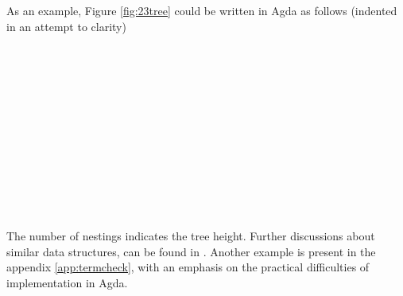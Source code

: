 \documentclass[12pt,twoside,notitlepage]{report}
\begin{document}
\begin{code}
\\
\>  \AgdaSymbol{(} \AgdaSymbol{:} \AgdaSymbol{)} \AgdaSymbol{:}  \<%
\\
\>[0]\<[2]%
\>[2] \AgdaSymbol{:}    \<%
\\
\>[0]\<[2]%
\>[2] \AgdaSymbol{:}  \AgdaSymbol{(} \AgdaSymbol{)}   \<%
\\
\end{code}

As an example, Figure \ref{fig:23tree} could be written in Agda as follows (indented in an attempt to clarity)

\begin{code}
\\
\> \AgdaSymbol{:}  \<%
\\
\> \AgdaSymbol{=} \AgdaSymbol{(}\AgdaSymbol{(}\AgdaSymbol{(}\<%
\\
\>[2]\<[14]%
\>[14]\AgdaSymbol{(}\<%
\\
\>[14]\<[18]%
\>[18]\AgdaSymbol{(}\<%
\\
\>[18]\<[20]%
\>[20]\AgdaSymbol{(}   \AgdaSymbol{)}\<%
\\
\>[18]\<[20]%
\>[20]\AgdaSymbol{(}  \AgdaSymbol{)}\<%
\\
\>[18]\<[20]%
\>[20]\AgdaSymbol{(}  \AgdaSymbol{))}\<%
\\
\>[0]\<[18]%
\>[18]\AgdaSymbol{(}\<%
\\
\>[18]\<[20]%
\>[20]\AgdaSymbol{(}   \AgdaSymbol{)}\<%
\\
\>[18]\<[20]%
\>[20]\AgdaSymbol{(}  \AgdaSymbol{))))))}\<%
\\
\end{code}
The number of  nestings indicates the tree height. 
Further discussions about similar data structures, can be found in \cite{nestedhinze}. Another example is present in the appendix \ref{app:termcheck}, with an emphasis on the practical difficulties of implementation in Agda.
\end{document}
